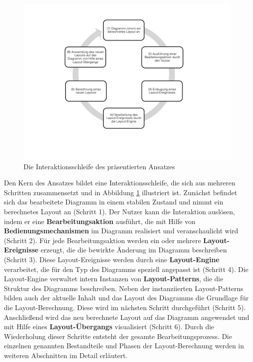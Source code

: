 \begin{figure}[hbt]
    \centering
    \includegraphics[scale=0.75]{resources/interaction-loop}
    \caption{Die Interaktionsschleife des präsentierten Ansatzes}
    \label{fig:interaction-loop}
\end{figure}

Den Kern des Ansatzes bildet eine Interaktionsschleife, die sich aus mehreren Schritten zusammensetzt und in Abbildung \ref{fig:interaction-loop} illustriert ist. Zunächst befindet sich das bearbeitete Diagramm in einem stabilen Zustand und nimmt ein berechnetes Layout an (Schritt 1). Der Nutzer kann die Interaktion auslösen, indem er eine \textbf{Bearbeitungsaktion} ausführt, die mit Hilfe von \textbf{Bedienungsmechanismen} im Diagramm realisiert und veranschaulicht wird (Schritt 2). Für jede Bearbeitungsaktion werden ein oder mehrere \textbf{Layout-Ereignisse} erzeugt, die die bewirkte Änderung im Diagramm beschreiben (Schritt 3). Diese Layout-Ereignisse werden durch eine \textbf{Layout-Engine} verarbeitet, die für den Typ des Diagramms speziell angepasst ist (Schritt 4). Die Layout-Engine verwaltet intern Instanzen von \textbf{Layout-Patterns}, die die Struktur des Diagramms beschreiben. Neben der instanziierten Layout-Patterns bilden auch der aktuelle Inhalt und das Layout des Diagramms die Grundlage für die Layout-Berechnung. Diese wird im nächsten Schritt durchgeführt (Schritt 5). Anschließend wird das neu berechnete Layout auf das Diagramm angewendet und mit Hilfe eines \textbf{Layout-Übergangs} visualisiert (Schritt 6). Durch die Wiederholung dieser Schritte entsteht der gesamte Bearbeitungsprozess. Die einzelnen genannten Bestandteile und Phasen der Layout-Berechnung werden in weiteren Abschnitten im Detail erläutert.


